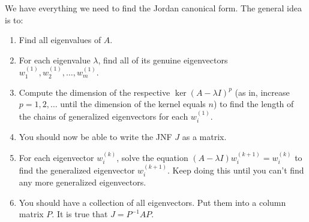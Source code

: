 	\begin{algo}
		We have everything we need to find the Jordan canonical form. The general idea is to: 
		\begin{enumerate}
			\item Find all eigenvalues of $A$. 

			\item For each eigenvalue $\lambda$, find all of its genuine eigenvectors $w_1^{(1)}, w_2^{(1)}, \ldots, w_m^{(1)}$. 

			\item Compute the dimension of the respective $\ker(A - \lambda I)^p$ (as in, increase $p = 1, 2, \ldots$ until the dimension of the kernel equals $n$) to find the length of the chains of generalized eigenvectors for each $w_i^{(1)}$. 

			\item You should now be able to write the JNF $J$ as a matrix. 

			\item For each eigenvector $w_i^{(k)}$, solve the equation $(A - \lambda I) w_i^{(k+1)} = w_i^{(k)}$ to find the generalized eigenvector $w_i^{(k+1)}$. Keep doing this until you can't find any more generalized eigenvectors. 

			\item You should have a collection of all eigenvectors. Put them into a column matrix $P$. It is true that $J = P^{-1} A P$. 
		\end{enumerate}
  \end{algo}
	
